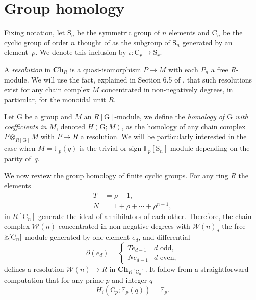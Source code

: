 
\section{Group homology} \label{s:goup homology}

Fixing notation, let $\mathrm{S}_n$ be the symmetric group of $n$ elements and $\mathrm{C}_n$ be the cyclic group of order $n$ thought of as the subgroup of $\mathrm{S}_n$ generated by an element~$\rho$. We denote this inclusion by $\iota : \mathrm C_r \to \mathrm S_r$.

A \textit{resolution} in $\mathbf{Ch}_R$ is a quasi-isomorphism $P \to M$ with each $P_n$ a free \mbox{$R$-module}. We will use the fact, explained in Section 6.5 of \cite{jacobson1989algebra}, that such resolutions exist for any chain complex $M$ concentrated in non-negatively degrees, in particular, for the monoidal unit $R$.

Let $\mathrm G$ be a group and $M$ an $R[\mathrm G]$-module, we define the \textit{homology of $\mathrm G$ with coefficients in $M$}, denoted $H(\mathrm G; M)$, as the homology of any chain complex $P \otimes_{R[\mathrm G]} M$ with $P \to R$ a resolution. We will be particularly interested in the case when $M = \mathbb F_p(q)$ is the trivial or sign $\mathbb F_p[\mathrm{S}_n]$-module depending on the parity of~$q$.

We now review the group homology of finite cyclic groups. For any ring $R$ the elements
\begin{equation} \label{eq: T and R definition}
\begin{split}
T &= \rho - 1, \\
N &= 1 + \rho + \cdots + \rho^{n-1},
\end{split}
\end{equation}
in $R[\mathrm{C}_n]$ generate the ideal of annihilators of each other. Therefore, the chain complex $\mathcal W(n)$ concentrated in non-negative degrees with $\mathcal W(n)_d$ the free $\mathbb{Z}[\mathrm{C}_n]$-module generated by one element $e_d$, and differential
\begin{equation*}
\partial(e_d) = \begin{cases}
Te_{d-1} & d \text{ odd,} \\
Ne_{d-1} & d \text{ even,}
\end{cases}
\end{equation*}
defines a resolution $\mathcal W(n) \to R$ in $\mathbf{Ch}_{R[\mathrm{C}_n]}$. It follow from a straightforward computation that for any prime $p$ and integer $q$
\begin{equation*}
H_i(\mathrm{C}_p; \mathbb{F}_p(q)) = \mathbb{F}_p.
\end{equation*}

